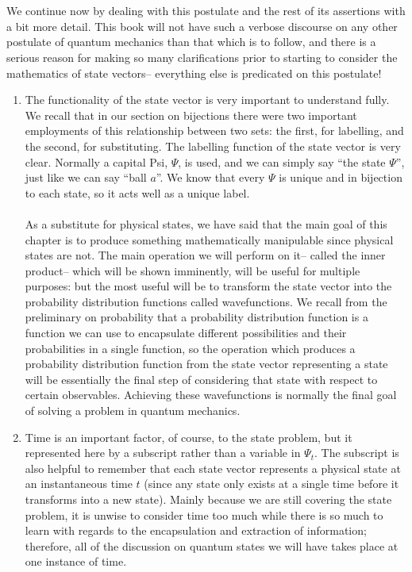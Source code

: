 \\\\
We continue now by dealing with this postulate and the rest of its assertions with a bit more detail. This book will not have such a verbose discourse on any other postulate of quantum mechanics than that which is to follow, and there is a serious reason for making so many clarifications prior to starting to consider the mathematics of state vectors-- everything else is predicated on this postulate!
\begin{enumerate}
    \item The functionality of the state vector is very important to understand fully. We recall that in our section on bijections there were two important employments of this relationship between two sets: the first, for labelling, and the second, for substituting. The labelling function of the state vector is very clear. Normally a capital Psi, $\Psi$, is used, and we can simply say ``the state $\Psi$'', just like we can say ``ball $a$''. We know that every $\Psi$ is unique and in bijection to each state, so it acts well as a unique label.
    \\\\
    As a substitute for physical states, we have said that the main goal of this chapter is to produce something mathematically manipulable since physical states are not. The main operation we will perform on it-- called the inner product-- which will be shown imminently, will be useful for multiple purposes: but the most useful will be to transform the state vector into the probability distribution functions called wavefunctions. We recall from the preliminary on probability that a probability distribution function is a function we can use to encapsulate different possibilities and their probabilities in a single function, so the operation which produces a probability distribution function from the state vector representing a state will be essentially the final step of considering that state with respect to certain observables. Achieving these wavefunctions is normally the final goal of solving a problem in quantum mechanics.
    \item Time is an important factor, of course, to the state problem, but it represented here by a subscript rather than a variable in $\Psi_{t}$. The subscript is also helpful to remember that each state vector represents a physical state at an instantaneous time $t$ (since any state only exists at a single time before it transforms into a new state). Mainly because we are still covering the state problem, it is unwise to consider time too much while there is so much to learn with regards to the encapsulation and extraction of information; therefore, all of the discussion on quantum states we will have takes place at one instance of time.

\end{enumerate}
